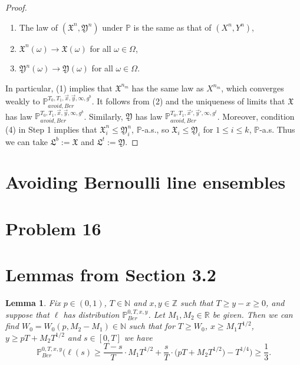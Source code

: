 \documentclass[12pt]{article}
\newtheorem{lemma}{Lemma}
\begin{document}
\begin{proof}
\begin{enumerate}[label=(\arabic*)]
		\item The law of $(\mathfrak{X}^n,\mathfrak{Y}^n)$ under $\mathbb{P}$ is the same as that of $(X^n,Y^n)$,
		
		\item $\mathfrak{X}^n(\omega) \longrightarrow \mathfrak{X}(\omega)$ for all $\omega\in\Omega$,
		
		\item $\mathfrak{Y}^n(\omega) \longrightarrow \mathfrak{Y}(\omega)$ for all $\omega\in\Omega$.
		
	\end{enumerate}

	In particular, (1) implies that $\mathfrak{X}^{n_m}$ has the same law as $X^{n_m}$, which converges weakly to $\mathbb{P}_{avoid,Ber}^{T_0,T_1,\vec{x},\vec{y},\infty,g^b}$. It follows from (2) and the uniqueness of limits that $\mathfrak{X}$ has law $\mathbb{P}_{avoid,Ber}^{T_0,T_1,\vec{x},\vec{y},\infty,g^b}$. Similarly, $\mathfrak{Y}$ has law $\mathbb{P}_{avoid,Ber}^{T_0,T_1,\vec{x}',\vec{y}',\infty,g^t}$. Moreover, condition (4) in Step 1 implies that $\mathfrak{X}^n_i \leq \mathfrak{Y}^n_i$, $\mathbb{P}$-a.s., so $\mathfrak{X}_i \leq \mathfrak{Y}_i$ for $1\leq i\leq k$, $\mathbb{P}$-a.s. Thus we can take $\mathfrak{L}^b := \mathfrak{X}$ and $\mathfrak{L}^t := \mathfrak{Y}$.
	
	\end{proof}


\section{Avoiding Bernoulli line ensembles}

	\section*{Problem 16}
	
	\section*{Lemmas from Section 3.2}
	
	\begin{lemma}\label{LemmaHalfS4} Fix $p \in (0,1)$, $T \in \mathbb{N}$ and $x, y\in \mathbb{Z}$ such that $T \geq y-x \geq 0$, and suppose that $\ell$ has distribution $\mathbb{P}^{0,T,x,y}_{Ber}$. Let $M_1, M_2 \in \mathbb{R}$ be given. Then we can find $W_0 = W_0(p,M_2 - M_1) \in \mathbb{N}$ such that for $T \geq W_0$, $x \geq M_1 T^{1/2}$, $y \geq pT + M_2 T^{1/2}$ and $s \in [0,T]$ we have
		\begin{equation}\label{halfEq1S4}
		\mathbb{P}^{0,T,x,y}_{Ber}\Big( \ell(s)  \geq \frac{T-s}{T} \cdot M_1 T^{1/2} + \frac{s}{T} \cdot \big(p T + M_2 T^{1/2}\big) - T^{1/4} \Big) \geq \frac{1}{3}.
		\end{equation}
	\end{lemma}
\end{document}

